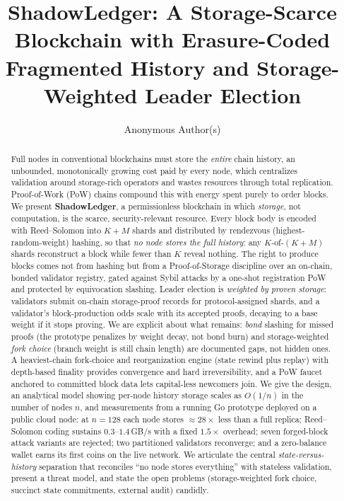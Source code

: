 \documentclass[sigconf,anonymous,review]{acmart}
\begin{document}
\title{ShadowLedger: A Storage-Scarce Blockchain with Erasure-Coded Fragmented History and Storage-Weighted Leader Election}

\author{Anonymous Author(s)}

\begin{abstract}
Full nodes in conventional blockchains must store the \emph{entire} chain history, an
unbounded, monotonically growing cost paid by every node, which centralizes validation
around storage-rich operators and wastes resources through total replication. Proof-of-Work
(PoW) chains compound this with energy spent purely to order blocks. We present
\textbf{ShadowLedger}, a permissionless blockchain in which \emph{storage}, not
computation, is the scarce, security-relevant resource. Every block body is encoded with
Reed--Solomon into $K{+}M$ shards and distributed by rendezvous (highest-random-weight)
hashing, so that \emph{no node stores the full history}: any $K$-of-$(K{+}M)$ shards
reconstruct a block while fewer than $K$ reveal nothing. The right to produce blocks comes
not from hashing but from a Proof-of-Storage discipline over an on-chain, bonded validator
registry, gated against Sybil attacks by a one-shot registration PoW and protected by
equivocation slashing. Leader election is \emph{weighted by proven storage}: validators submit
on-chain storage-proof records for protocol-assigned shards, and a validator's block-production
odds scale with its accepted proofs, decaying to a base weight if it stops proving. We are explicit
about what remains: \emph{bond} slashing for missed proofs (the prototype penalizes by weight
decay, not bond burn) and storage-weighted \emph{fork choice} (branch weight is still chain length)
are documented gaps, not hidden ones. A heaviest-chain fork-choice and reorganization engine (state rewind
plus replay) with depth-based finality provides convergence and hard irreversibility, and a
PoW faucet anchored to committed block data lets capital-less newcomers join. We give the
design, an analytical model showing per-node history storage scales as $O(1/n)$ in the
number of nodes $n$, and measurements from a running Go prototype deployed on a public cloud
node: at $n{=}128$ each node stores $\approx 28\times$ less than a full replica; Reed--Solomon
coding sustains $0.3$--$1.4$\,GB/s with a fixed $1.5\times$ overhead; seven forged-block
attack variants are rejected; two partitioned validators reconverge; and a zero-balance
wallet earns its first coins on the live network. We articulate the central
\emph{state-versus-history} separation that reconciles ``no node stores everything'' with
stateless validation, present a threat model, and state the open problems
(storage-weighted fork choice, succinct state commitments, external audit) candidly.
\end{abstract}
\end{document}

